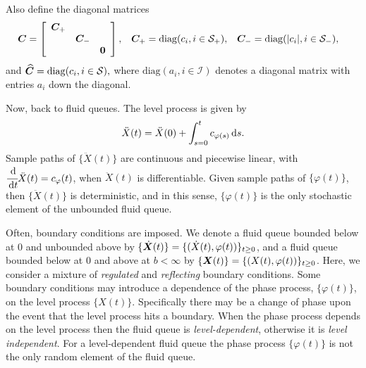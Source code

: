 Also define the diagonal matrices 
\begin{align*}
	\boldsymbol C &= \left[\begin{array}{ccc} \boldsymbol C_+ && \\ &\boldsymbol C_-& \\ && \boldsymbol 0\end{array}\right], && \boldsymbol C_+ = \mathrm{diag}(c_i,i\in\mathcal{S}_+), && \boldsymbol C_- = \mathrm{diag}(|c_i|,i\in\mathcal{S}_-),
\end{align*}
and 
\(
	\widehat{\boldsymbol C} = \mathrm{diag}(c_i,i\in\mathcal{S}),
\)
where \(\mathrm{diag}(a_i,i\in\mathcal I)\) denotes a diagonal matrix with entries \(a_i\) down the diagonal. 

Now, back to fluid queues. The level process is given by 
\[\ddot X(t) = \ddot X(0) + \int_{s=0}^t c_{\varphi(s)}\, \mathrm{d} s.\]
Sample paths of \(\{\ddot X (t)\}\) are continuous and piecewise linear, with \(\cfrac{\, \mathrm{d} }{\, \mathrm{d} t} \ddot X(t) = c_\varphi(t)\), when \(\ddot X(t)\) is differentiable. Given sample paths of \(\{\varphi(t)\}\), then \(\{\ddot X(t)\}\) is deterministic, and in this sense, \(\{\varphi(t)\}\) is the only stochastic element of the unbounded fluid queue. 

Often, boundary conditions are imposed. We denote a fluid queue bounded below at \(0\) and unbounded above by \(\{\dot{\boldsymbol X}(t)\} = \{(\dot X(t),\varphi(t))\}_{t\geq0}\), and a fluid queue bounded below at \(0\) and above at \(b<\infty\) by \(\{{\boldsymbol X}(t)\} = \{( X(t),\varphi(t))\}_{t\geq0}\). Here, we consider a mixture of \emph{regulated} and \emph{reflecting} boundary conditions. Some boundary conditions may introduce a dependence of the phase process, \(\{\varphi(t)\}\), on the level process \(\{X(t)\}\). Specifically there may be a change of phase upon the event that the level process hits a boundary. When the phase process depends on the level process then the fluid queue is \emph{level-dependent}, otherwise it is \emph{level independent}. For a level-dependent fluid queue the phase process \(\{\varphi(t)\}\) is not the only random element of the fluid queue.

